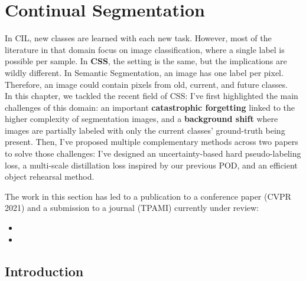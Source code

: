 \chapter{Continual Segmentation}
\label{chapter:segmentation}

\begin{chapabstract}
    In \acf{CIL}, new classes are learned with each new task. However, most of the literature in
    that domain focus on image classification, where a single label is possible per sample. In
    \textbf{\acf{CSS}}, the setting is the same, but the implications are wildly different. In Semantic
    Segmentation, an image has one label per pixel. Therefore, an image could contain pixels from
    old, current, and future classes.
    \\
    In this chapter, we tackled the recent field of \acf{CSS}: I've first highlighted the main
    challenges of this domain: an important \textbf{catastrophic forgetting} linked to the higher complexity
    of segmentation images, and a \textbf{background shift} where images are partially labeled with
    only the current classes' ground-truth being present. Then, I've proposed multiple complementary
    methods across two papers to solve those challenges: I've designed an uncertainty-based
    hard pseudo-labeling loss, a multi-scale distillation loss inspired by our previous POD, and
    an efficient object rehearsal method.

    The work in this section has led to a publication to a conference paper (CVPR 2021) and a submission
    to a journal (TPAMI) currently under review:

    \begin{itemize}
        \item {}
        \item {}
    \end{itemize}

\end{chapabstract}
\newpage

\minitoc
{}



\section{Introduction}
\label{sec:seg_intro}

